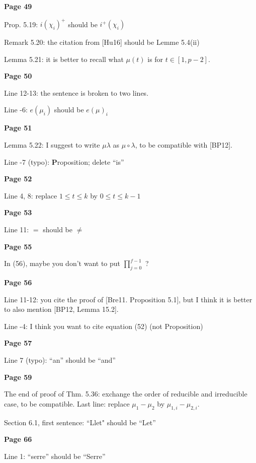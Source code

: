 \documentclass{amsart}
\theoremstyle{definition}
\newcommand{\vv}{\vspace{2mm}}
\begin{document}
\vv
 \noindent\textbf{Page 49}
 
 
Prop. 5.19: $i(\chi_i)^+$ should be $i^+(\chi_i)$ 

Remark 5.20: the citation from [Hu16] should be Lemme 5.4(ii)

Lemma 5.21: it is better to recall what $\mu(t)$ is for $t\in[1,p-2]$.
    
\vv
 \noindent\textbf{Page 50}

Line 12-13: the sentence is broken to two lines.

Line -6: $e(\mu_i)$ should be $e(\mu)_i$ 

\vv
 \noindent\textbf{Page 51}
 
Lemma 5.22: I suggest to write $\mu\lambda$   as $\mu\circ\lambda$, to be compatible with [BP12].

Line -7 (typo): \textbf{P}roposition;   delete ``is''

\vv 
 \noindent\textbf{Page 52}
 
Line 4, 8: replace $1\leq t\leq k$ by $0\leq t\leq k-1$ 
   
\vv

 \noindent\textbf{Page 53}
 
Line 11: $=$ should be $\neq$     

\vv
 \noindent\textbf{Page 55}
 
 In (56), maybe you don't want to put $\prod_{j=0}^{f-1}$ ? 
 
\vv
 \noindent\textbf{Page 56}
 
 Line 11-12: you cite the proof of [Bre11. Proposition 5.1], but I think it is better to also mention [BP12, Lemma 15.2].
 
Line -4: I think you want to cite equation (52) (not Proposition)   
 
\vv
 \noindent\textbf{Page 57}
 
 Line 7 (typo): ``an'' should be ``and''
 
\vv
 \noindent\textbf{Page 59}
 
The end of proof of Thm. 5.36: exchange the order of reducible and irreducible case, to be compatible. Last line: replace $\mu_1-\mu_2$ by $\mu_{1,i}-\mu_{2,i}$. 
 
Section 6.1, first sentence: ``Llet" should be ``Let'' 
 
  
\vv \noindent\textbf{Page 66}

Line 1: ``serre'' should be ``Serre''  
 
 
\end{document}

